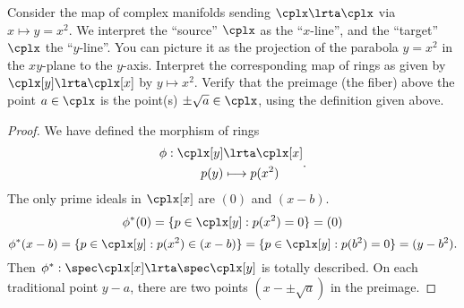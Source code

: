 \begin{exr}
Consider the map of complex manifolds sending $\cplx\lrta \cplx$ via $x\mapsto y=x^2$. We interpret the “source” $\cplx$ as the “$x$-line”, and the “target” $\cplx$ the “$y$-line”. You can picture it as the projection of the parabola $y=x^2$ in the $xy$-plane to the $y$-axis. Interpret the corresponding map of rings as given by ${\cplx[y] \lrta \cplx[x]}$ by  $y\mapsto x^2$. Verify that the preimage (the fiber) above the point $a\in\cplx$ is the point(s) $\pm\sqrt a\in\cplx$, using the definition given above.
\end{exr}
\begin{proof}
We have defined the morphism of rings
$$
\begin{aligned}
\phi:\cplx[y]&\lrta\cplx[x]\\
 p(y)&\longmapsto p(x^2)
\end{aligned}.
$$
The only prime ideals in $\cplx[x]$ are $(0)$ and $(x-b)$. 
$$
\phi^*(0)=\{p\in \cplx[y]: p(x^2)=0\}=(0)
$$
$$
\phi^*(x-b)=\{p\in\cplx[y]: p(x^2)\in (x-b)\}=\{p\in\cplx[y]: p(b^2)=0\}=(y-b^2).
$$
Then $\phi^*: \spec\cplx[x]\lrta\spec \cplx[y]$  is totally described. On each traditional point $y-a$, there are two points $(x-\pm \sqrt a)$ in the preimage.
\end{proof}

